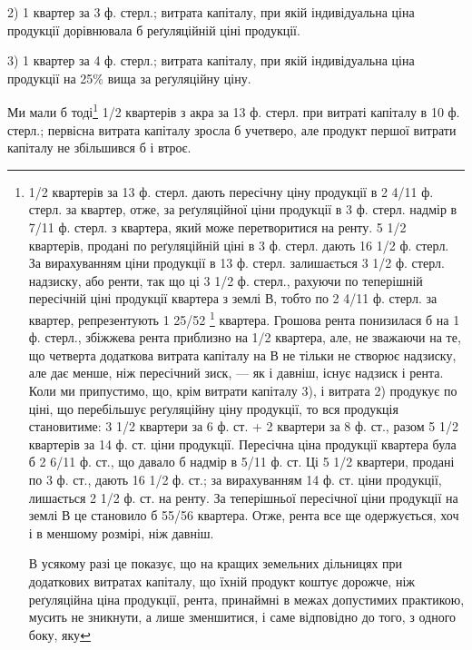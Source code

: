 2) 1 квартер за 3 ф. стерл.; витрата капіталу, при якій індивідуальна
ціна продукції дорівнювала б реґуляційній ціні продукції.

3) 1 квартер за 4 ф. стерл.; витрата капіталу, при якій індивідуальна
ціна продукції на 25\% вища за реґуляційну ціну.

Ми мали б тоді\footnote{
1/2 квартерів за 13 ф. стерл. дають пересічну ціну продукції в 2 4/11 ф. стерл.
за квартер, отже, за реґуляційної ціни продукції в 3 ф. стерл. надмір
в 7/11 ф. стерл. з квартера, який може перетворитися на ренту. 5 1/2 квартерів,
продані по реґуляційній ціні в 3 ф. стерл. дають 16 1/2 ф. стерл. За вирахуванням
ціни продукції в 13 ф. стерл. залишається 3 1/2 ф. стерл. надзиску, або
ренти, так що ці 3 1/2 ф. стерл., рахуючи по теперішній пересічній ціні продукції
квартера з землі В, тобто по 2 4/11 ф. стерл. за квартер, репрезентують
1 25/52 \footnote*{
В німецькому тексті тут стоїть: «1 5/72». Очевидна помилка. Прим. Ред.
} квартера. Грошова рента понизилася б на 1 ф. стерл., збіжжева
рента приблизно на 1/2 квартера, але, не зважаючи на те, що четверта додаткова
витрата капіталу на В не тільки не створює надзиску, але дає менше, ніж
пересічний зиск, — як і давніш, існує надзиск і рента. Коли ми припустимо, що,
крім витрати капіталу 3), і витрата 2) продукує по ціні, що перебільшує реґуляційну
ціну продукції, то вся продукція становитиме: 3 1/2 квартери за
6 ф. ст. + 2 квартери за 8 ф. ст., разом 5 1/2 квартерів за 14 ф. ст. ціни продукції.
Пересічна ціна продукції квартера була б 2 6/11  ф. ст., що давало б надмір
в 5/11 ф. ст. Ці  5 1/2  квартери, продані по 3 ф. ст., дають 16 1/2 ф. ст.; за вирахуванням
14 ф. ст. ціни продукції, лишається 2 1/2 ф. ст. на ренту. За теперішньої
пересічної ціни продукції на землі В це становило б 55/56 квартера. Отже, рента
все ще одержується, хоч і в меншому розмірі, ніж давніш.

В усякому разі це показує, що на кращих земельних дільницях при додаткових
витратах капіталу, що їхній продукт коштує дорожче, ніж реґуляційна
ціна продукції, рента, принаймні в межах допустимих практикою, мусить не
зникнути, а лише зменшитися, і саме відповідно до того, з одного боку, яку
} 1/2  квартерів з акра за 13 ф. стерл. при витраті капіталу
в 10 ф. стерл.; первісна витрата капіталу зросла б учетверо, але продукт
першої витрати капіталу не збільшився б і втроє.
\parbreak{}  %
